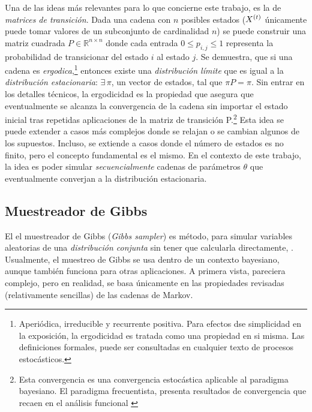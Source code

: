 \documentclass[../Main/Main.tex]{subfiles}
\begin{document}
Una de las ideas más relevantes para lo que concierne este trabajo, es la de \textit{matrices de transición}. Dada una cadena con $n$ posibles estados ($X^{(t)}$ únicamente puede tomar valores de un subconjunto de cardinalidad $n$) se puede construir una matriz cuadrada $P\in\mathbb{R}^{n\times n}$ donde cada entrada $0\leq p_{i,j}\leq1$ representa la probabilidad de transicionar del estado $i$ al estado $j$. Se demuestra, que si una cadena es \textit{ergodica},\footnote{Aperiódica, irreducible y  recurrente positiva. Para efectos dse simplicidad en la exposición, la ergodicidad es tratada como una propiedad en si misma. Las definiciones formales, puede ser consultadas en cualquier texto de procesos estocásticos.} entonces existe una \textit{distribución límite} que es igual a la \textit{distribución estacionaria}: $\exists \,\pi$, un vector de estados, tal que $\pi P = \pi$. Sin entrar en los detalles técnicos, la ergodicidad es la propiedad que asegura que eventualmente se alcanza la convergencia de la cadena sin importar el estado inicial tras repetidas aplicaciones de la matriz de transición P.\footnote{Esta convergencia es una convergencia estocástica aplicable al paradigma bayesiano. El paradigma frecuentista, presenta resultados de convergencia que recaen en el análisis funcional \autocite{stone1985additive}} 
Esta idea se puede extender a casos más complejos donde se relajan o se cambian algunos de los supuestos. Incluso, se extiende a casos donde el número de estados es no finito, pero el concepto fundamental es el mismo.  En el contexto de este trabajo, la idea es poder simular \textit{secuencialmente} cadenas de parámetros $\theta$ que eventualmente converjan a la distribución estacionaria. 

\subsection{Muestreador de Gibbs}
El el muestreador de Gibbs (\textit{Gibbs sampler}) es método, para simular variables aleatorias de una \textit{distribución conjunta} sin tener que calcularla directamente, \autocite{gelfand1990sampling}. Usualmente, el muestreo de Gibbs se usa dentro de un contexto bayesiano, aunque también funciona para otras aplicaciones. A primera vista, pareciera complejo, pero en realidad, se basa únicamente en las propiedades revisadas (relativamente sencillas) de las cadenas de Markov.
\end{document}
